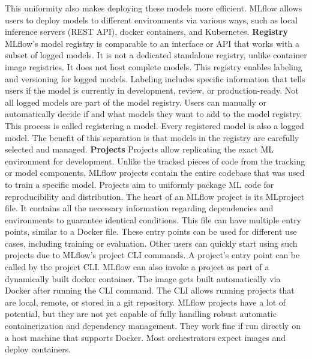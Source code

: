 This uniformity also makes deploying these models more efficient.
MLflow allows users to deploy models to different environments via various ways, such as local inference servers (REST API), docker containers, and Kubernetes.
\vspace{5mm}
\newline
\textbf{Registry}\newline
MLflow's model registry is comparable to an interface or API that works with a subset of logged models.
It is not a dedicated standalone registry, unlike container image registries.
It does not host complete models.
This registry enables labeling and versioning for logged models.
Labeling includes specific information that tells users if the model is currently in development, review, or production-ready.
Not all logged models are part of the model registry.
Users can manually or automatically decide if and what models they want to add to the model registry.
This process is called registering a model.
Every registered model is also a logged model.
The benefit of this separation is that models in the registry are carefully selected and managed.
\vspace{5mm}
\newline
\textbf{Projects}\newline
Projects allow replicating the exact ML environment for development.
Unlike the tracked pieces of code from the tracking or model components, MLflow projects contain the entire codebase that was used to train a specific model.
Projects aim to uniformly package ML code for reproducibility and distribution.
The heart of an MLflow project is its MLproject file.
It contains all the necessary information regarding dependencies and environments to guarantee identical conditions.
This file can have multiple entry points, similar to a Docker file.
These entry points can be used for different use cases, including training or evaluation.
Other users can quickly start using such projects due to MLflow's project CLI commands.
A project's entry point can be called by the project CLI.
MLflow can also invoke a project as part of a dynamically built docker container.
The image gets built automatically via Docker after running the CLI command.
The CLI allows running projects that are local, remote, or stored in a git repository.
MLflow projects have a lot of potential, but they are not yet capable of fully handling robust automatic containerization and dependency management.
They work fine if run directly on a host machine that supports Docker.
Most orchestrators expect images and deploy containers.
